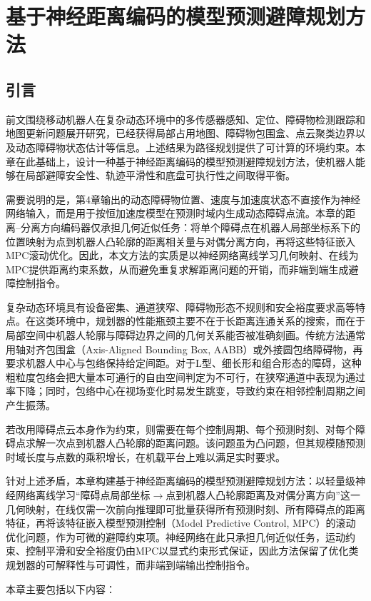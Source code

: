 \chapter{基于神经距离编码的模型预测避障规划方法}
\section{引言}
前文围绕移动机器人在复杂动态环境中的多传感器感知、定位、障碍物检测跟踪和地图更新问题展开研究，已经获得局部占用地图、障碍物包围盒、点云聚类边界以及动态障碍物状态估计等信息。上述结果为路径规划提供了可计算的环境约束。本章在此基础上，设计一种基于神经距离编码的模型预测避障规划方法，使机器人能够在局部避障安全性、轨迹平滑性和底盘可执行性之间取得平衡。

需要说明的是，第4章输出的动态障碍物位置、速度与加速度状态不直接作为神经网络输入，而是用于按恒加速度模型在预测时域内生成动态障碍点流。本章的距离--分离方向编码器仅承担几何近似任务：将单个障碍点在机器人局部坐标系下的位置映射为点到机器人凸轮廓的距离相关量与对偶分离方向，再将这些特征嵌入MPC滚动优化。因此，本文方法的实质是以神经网络离线学习几何映射、在线为MPC提供距离约束系数，从而避免重复求解距离问题的开销，而非端到端生成避障控制指令。

复杂动态环境具有设备密集、通道狭窄、障碍物形态不规则和安全裕度要求高等特点。在这类环境中，规划器的性能瓶颈主要不在于长距离连通关系的搜索，而在于局部空间中机器人轮廓与障碍边界之间的几何关系能否被准确刻画。传统方法通常用轴对齐包围盒（Axis-Aligned Bounding Box, AABB）或外接圆包络障碍物，再要求机器人中心与包络保持给定间距。对于L型、细长形和组合形态的障碍，这种粗粒度包络会把大量本可通行的自由空间判定为不可行，在狭窄通道中表现为通过率下降；同时，包络中心在视场变化时易发生跳变，导致约束在相邻控制周期之间产生振荡。

若改用障碍点云本身作为约束，则需要在每个控制周期、每个预测时刻、对每个障碍点求解一次点到机器人凸轮廓的距离问题。该问题虽为凸问题，但其规模随预测时域长度与点数的乘积增长，在机载平台上难以满足实时要求。

针对上述矛盾，本章构建基于神经距离编码的模型预测避障规划方法：以轻量级神经网络离线学习“障碍点局部坐标$\rightarrow$点到机器人凸轮廓距离及对偶分离方向”这一几何映射，在线仅需一次前向推理即可批量获得所有预测时刻、所有障碍点的距离特征，再将该特征嵌入模型预测控制（Model Predictive Control, MPC）的滚动优化问题，作为可微的避障约束项。神经网络在此只承担几何近似任务，运动约束、控制平滑和安全裕度仍由MPC以显式约束形式保证，因此方法保留了优化类规划器的可解释性与可调性，而非端到端输出控制指令。

本章主要包括以下内容：

